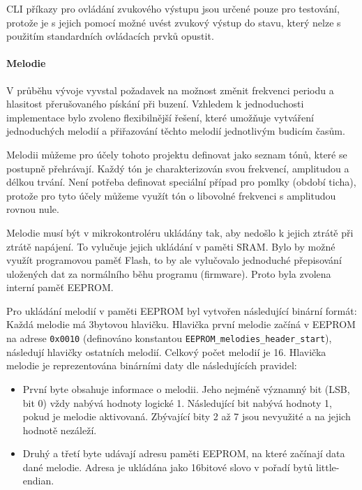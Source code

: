 CLI příkazy pro ovládání zvukového výstupu jsou určené pouze pro testování,
protože je s jejich pomocí možné uvést zvukový výstup do stavu, který nelze
s použitím standardních ovládacích prvků opustit.



\paragraph{Melodie}
V průběhu vývoje vyvstal požadavek na možnost změnit frekvenci periodu
a hlasitost přerušovaného pískání při buzení. Vzhledem k jednoduchosti
implementace bylo zvoleno flexibilnější řešení, které umožňuje vytváření
jednoduchých melodií a přiřazování těchto melodií jednotlivým budicím časům.

Melodii můžeme pro účely tohoto projektu definovat jako seznam tónů, které se
postupně přehrávají. Každý tón je charakterizován svou frekvencí, amplitudou
a délkou trvání. Není potřeba definovat speciální případ pro pomlky (období
ticha), protože pro tyto účely můžeme využít tón o libovolné frekvenci
s amplitudou rovnou nule.

Melodie musí být v mikrokontroléru ukládány tak, aby nedošlo k jejich ztrátě
při ztrátě napájení. To vylučuje jejich ukládání v paměti SRAM. Bylo by možné
využít programovou paměť Flash, to by ale vylučovalo jednoduché přepisování
uložených dat za normálního běhu programu (firmware). Proto byla zvolena
interní paměť EEPROM.

Pro ukládání melodií v paměti EEPROM byl vytvořen následující binární formát:
Každá melodie má 3bytovou hlavičku. Hlavička první melodie začíná v EEPROM na
adrese \texttt{0x0010} (definováno konstantou
\verb|EEPROM_melodies_header_start|), následují hlavičky ostatních melodií.
Celkový počet melodií je 16. Hlavička melodie je reprezentována binárními daty
dle následujících pravidel:
\begin{itemize}[nosep]
    \item První byte obsahuje informace o melodii. Jeho nejméně významný bit
        (LSB, bit 0) vždy nabývá hodnoty logické 1. Následující bit nabývá
        hodnoty 1, pokud je melodie aktivovaná. Zbývající bity 2 až 7 jsou
        nevyužité a na jejich hodnotě nezáleží.
    \item Druhý a třetí byte udávají adresu paměti EEPROM, na které začínají
        data dané melodie. Adresa je ukládána jako 16bitové slovo v pořadí bytů
        little-endian.
\end{itemize}

